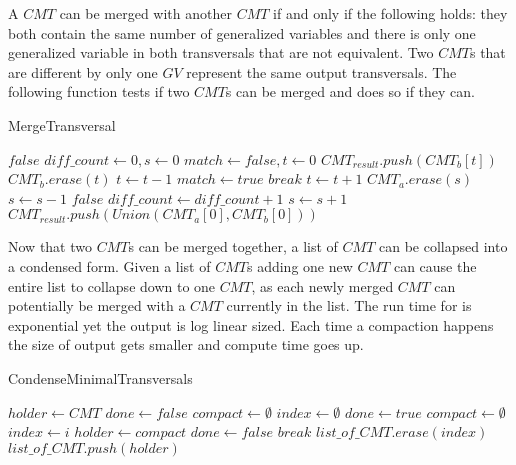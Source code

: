  A $CMT$ can be merged with another $CMT$ if and only if the following holds: they both contain the same number of generalized variables and there is only one generalized variable in both transversals that are not equivalent. Two $CMT$s that are different by only one $GV$ represent the same output transversals. The following function  tests if two $CMT$s can be merged and does so if they can.
 
\begin{algorithm}[H]
    \centering
	\caption{MergeTransversal}
	\label{MergeTransversal}
	
	\begin{algorithmic}[1]
		\State \Return $false$
		\EndIf
		\State $diff\_count \gets 0, s\gets 0$
		 {}
		\State $match \gets false, t \gets 0$
		\State $CMT_{result}.push(CMT_b[t])$
		\State $CMT_b.erase(t)$
		\State $t \gets t-1$
		\State $match \gets true$
		\State $break$
		\EndIf
		\State $t \gets t+1$
		\EndWhile
		\State $CMT_a.erase(s)$
		\State $s\gets s-1$
		\Else
		\State \Return $false$
		\Else
		\State $diff\_count \gets diff\_count +1$
		\EndIf
		\EndIf
		\State $s \gets s+1$
		\EndWhile
		\State $CMT_{result}.push(Union(CMT_a[0],CMT_b[0]))$  
		\EndFunction
	\end{algorithmic}
\end{algorithm}

Now that two $CMT$s can be merged together, a list of $CMT$ can be collapsed into a condensed form. Given a list of $CMT$s adding one new $CMT$ can cause the entire list to collapse down to one $CMT$, as each newly merged $CMT$ can potentially be merged with a $CMT$ currently in the list. The run time for  is exponential yet the output is log linear sized. Each time a compaction happens the size of output gets smaller and compute time goes up. 


\begin{algorithm}[H]
    \centering
	\caption{CondenseMinimalTransversals}
	\label{CondenseMinimalTransversals}
	\begin{algorithmic}[1]
		\State $holder \gets CMT$
		\State $done \gets false$
		 {}
		\State $compact \gets \emptyset$ 
		\State $index \gets \emptyset$
		\State $done \gets true$
		\State $compact \gets \emptyset$
		\State $index \gets i$
		\State $holder \gets compact$
		\State $done \gets false$
		\State $break$
		\EndIf
		\EndFor
		\State $list\_of\_CMT.erase(index)$
		\Else
		\State $list\_of\_CMT.push(holder)$
		\EndIf
		\EndWhile
		\EndFunction
	\end{algorithmic}
\end{algorithm}


